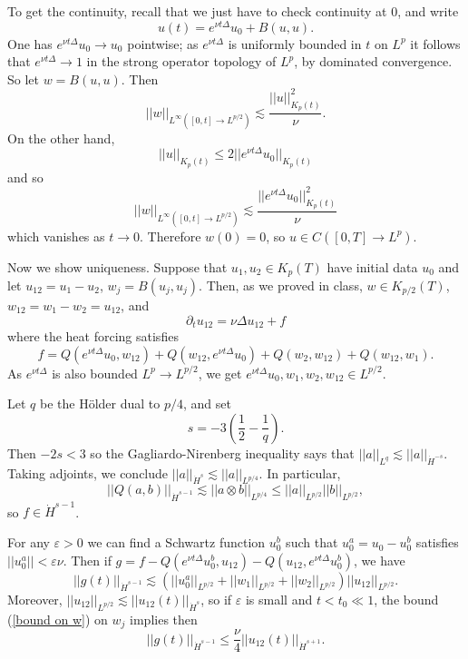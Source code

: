 \documentclass[10pt]{article}
\theoremstyle{definition}
\begin{document}
To get the continuity, recall that we just have to check continuity at $0$, and write
$$u(t) = e^{\nu t\Delta}u_0 + B(u, u).$$
One has $e^{\nu t\Delta}u_0 \to u_0$ pointwise; as $e^{\nu t\Delta}$ is uniformly bounded in $t$ on $L^p$ it follows that $e^{\nu t\Delta} \to 1$ in the strong operator topology of $L^p$, by dominated convergence.
So let $w = B(u, u)$. Then
$$||w||_{L^\infty([0, t] \to L^{p/2})} \lesssim \frac{||u||_{K_p(t)}^2}{\nu}.$$
On the other hand,
$$||u||_{K_p(t)} \leq 2||e^{\nu t\Delta} u_0||_{K_p(t)}$$
and so
\begin{equation}
\label{bound on w}
||w||_{L^\infty([0, t] \to L^{p/2})} \lesssim \frac{||e^{\nu t\Delta} u_0||_{K_p(t)}^2}{\nu}
\end{equation}
which vanishes as $t \to 0$.
Therefore $w(0) = 0$, so $u \in C([0, T] \to L^p)$.

Now we show uniqueness.
Suppose that $u_1, u_2 \in K_p(T)$ have initial data $u_0$ and let $u_{12} = u_1 - u_2$, $w_j = B(u_j, u_j)$.
Then, as we proved in class, $w \in K_{p/2}(T)$, $w_{12} = w_1 - w_2 = u_{12}$,
and
$$\partial_t u_{12} = \nu \Delta u_{12} + f$$
where the heat forcing satisfies
$$f = Q(e^{\nu t\Delta} u_0, w_{12}) + Q(w_{12}, e^{\nu t\Delta} u_0) + Q(w_2, w_{12}) + Q(w_{12}, w_1).$$
As $e^{\nu t\Delta}$ is also bounded $L^p \to L^{p/2}$, we get $e^{\nu t\Delta} u_0, w_1, w_2, w_{12} \in L^{p/2}$.

Let $q$ be the H\"older dual to $p/4$, and set
$$s = -3\left(\frac{1}{2} - \frac{1}{q}\right).$$
Then $-2s < 3$ so the Gagliardo-Nirenberg inequality says that $||a||_{L^q} \lesssim ||a||_{\dot H^{-s}}$. Taking adjoints, we conclude $||a||_{\dot H^s} \lesssim ||a||_{L^{p/4}}$. In particular,
\begin{equation}
\label{first Q bound}
||Q(a,b)||_{\dot H^{s-1}} \lesssim ||a \otimes b||_{L^{p/4}} \leq ||a||_{L^{p/2}} ||b||_{L^{p/2}},
\end{equation}
so $f \in \dot H^{s-1}$.

For any $\varepsilon > 0$ we can find a Schwartz function $u_0^b$ such that $u_0^a = u_0 - u_0^b$ satisfies $||u_0^a|| < \varepsilon \nu$.
Then if $g = f - Q(e^{\nu t\Delta} u_0^b, u_{12}) - Q(u_{12}, e^{\nu t\Delta} u_0^b)$, we have
$$||g(t)||_{\dot H^{s-1}} \lesssim (||u_0^a||_{L^{p/2}} + ||w_1||_{L^{p/2}} + ||w_2||_{L^{p/2}}) ||u_{12}||_{L^{p/2}}.$$
Moreover, $||u_{12}||_{L^{p/2}} \lesssim ||u_{12}(t)||_{\dot H^s}$, so if $\varepsilon$ is small and $t < t_0 \ll 1$, the bound (\ref{bound on w}) on $w_j$ implies then
\begin{equation}
\label{g bound}
||g(t)||_{\dot H^{s-1}} \leq \frac{\nu}{4} ||u_{12}(t)||_{\dot H^{s+1}}.
\end{equation}
\end{document}
